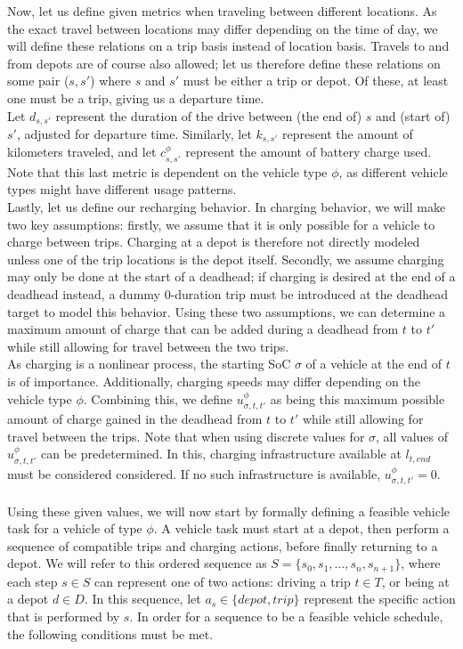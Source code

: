 \documentclass[]{article}
\begin{document}
Now, let us define given metrics when traveling between different locations. As the exact travel between locations may differ depending on the time of day, we will define these relations on a trip basis instead of location basis. Travels to and from depots are of course also allowed; let us therefore define these relations on some pair ($s,s'$) where $s$ and $s'$ must be either a trip or depot. Of these, at least one must be a trip, giving us a departure time. \\
Let $d_{s,s'}$ represent the duration of the drive between (the end of) $s$ and (start of) $s'$, adjusted for departure time. Similarly, let $k_{s, s'}$ represent the amount of kilometers traveled, and let $c^\phi_{s, s'}$ represent the amount of battery charge used. Note that this last metric is dependent on the vehicle type $\phi$, as different vehicle types might have different usage patterns. \\
Lastly, let us define our recharging behavior. In charging behavior, we will make two key assumptions: firstly, we assume that it is only possible for a vehicle to charge between trips. Charging at a depot is therefore not directly modeled unless one of the trip locations is the depot itself. Secondly, we assume charging may only be done at the start of a deadhead; if charging is desired at the end of a deadhead instead, a dummy 0-duration trip must be introduced at the deadhead target to model this behavior. Using these two assumptions, we can determine a maximum amount of charge that can be added during a deadhead from $t$ to $t'$ while still allowing for travel between the two trips. \\
As charging is a nonlinear process, the starting SoC $\sigma$ of a vehicle at the end of $t$ is of importance. Additionally, charging speeds may differ depending on the vehicle type $\phi$. Combining this, we define $u^\phi_{\sigma,t,t'}$ as being this maximum possible amount of charge gained in the deadhead from $t$ to $t'$ while still allowing for travel between the trips. Note that when using discrete values for $\sigma$, all values of $u^\phi_{\sigma,t, t'}$ can be predetermined. In this, charging infrastructure available at $l_{t,end}$ must be considered considered. If no such infrastructure is available, $u^\phi_{\sigma,t, t'} = 0$. \\\\
Using these given values, we will now start by formally defining a feasible vehicle task for a vehicle of type $\phi$. A vehicle task must start at a depot, then perform a sequence of compatible trips and charging actions, before finally returning to a depot. We will refer to this ordered sequence as $S = \{ s_0, s_1, \dots, s_n, s_{n+1} \}$, where each step $s \in S$ can represent one of two actions: driving a trip $t \in T$, or being at a depot $d \in D$. In this sequence, let $a_s \in \{ depot, trip \}$ represent the specific action that is performed by $s$. In order for a sequence to be a feasible vehicle schedule, the following conditions must be met. \\
\end{document}

